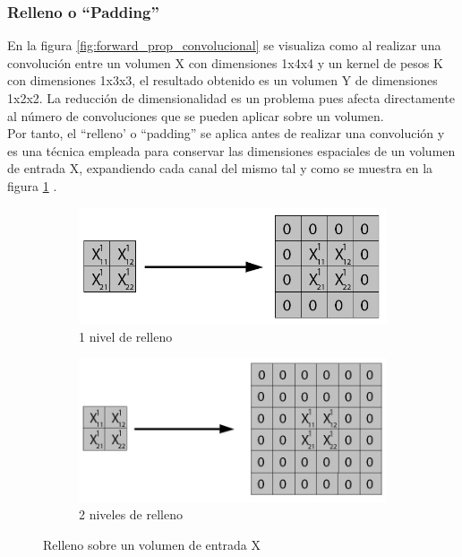\subsubsection{Relleno o ``Padding''}

En la figura \ref{fig:forward_prop_convolucional} se visualiza como al realizar una convolución entre un volumen X con dimensiones 1x4x4 y un kernel de pesos K con dimensiones 1x3x3, el resultado obtenido es un volumen Y de dimensiones 1x2x2. La reducción de dimensionalidad es un problema pues afecta directamente al número de convoluciones que se pueden aplicar sobre un volumen. \\
Por tanto, el ``relleno' o ``padding'' se aplica antes de realizar una convolución y es una técnica empleada para conservar las dimensiones espaciales de un volumen de entrada X, expandiendo cada canal del mismo tal y como se muestra en la figura \ref{fig:padding} \cite{padding_1}.

\begin{figure}[H]
	\centering
	\begin{subfigure}{.5\textwidth}
		\hspace{-15mm}
		\includegraphics[width=1.2\linewidth]{imagenes/padding_a_1_nivel.jpg}  
		\caption{1 nivel de relleno}
	\end{subfigure}%
	\begin{subfigure}{.5\textwidth}
		\hspace{5mm}
		\includegraphics[width=1.2\linewidth]{imagenes/padding_a_2_niveles.jpg}  
		\caption{2 niveles de relleno}
	\end{subfigure}
	\caption{Relleno sobre un volumen de entrada X}
	\label{fig:padding}
\end{figure}

